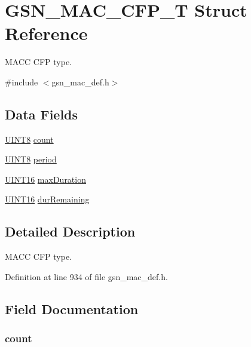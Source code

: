 \hypertarget{a00112}{
\section{GSN\_\-MAC\_\-CFP\_\-T Struct Reference}
\label{a00112}
}


MACC CFP type.  




{\ttfamily \#include $<$gsn\_\-mac\_\-def.h$>$}

\subsection*{Data Fields}
\begin{DoxyCompactItemize}
\item 
\hyperlink{a00660_gab27e9918b538ce9d8ca692479b375b6a}{UINT8} \hyperlink{a00112_a15d038ce936c9238dd449a4dcb7b94ad}{count}
\item 
\hyperlink{a00660_gab27e9918b538ce9d8ca692479b375b6a}{UINT8} \hyperlink{a00112_a83c873c8e939f66c2e0b67a9307918da}{period}
\item 
\hyperlink{a00660_ga09f1a1fb2293e33483cc8d44aefb1eb1}{UINT16} \hyperlink{a00112_a87b558313920210457d2d31f932fa47c}{maxDuration}
\item 
\hyperlink{a00660_ga09f1a1fb2293e33483cc8d44aefb1eb1}{UINT16} \hyperlink{a00112_aab5bdb906588480c72e73aac245666b2}{durRemaining}
\end{DoxyCompactItemize}


\subsection{Detailed Description}
MACC CFP type. 

Definition at line 934 of file gsn\_\-mac\_\-def.h.



\subsection{Field Documentation}
\hypertarget{a00112_a15d038ce936c9238dd449a4dcb7b94ad}{
\subsubsection[{count}]{ {\bf count}}}
\label{a00112_a15d038ce936c9238dd449a4dcb7b94ad}


